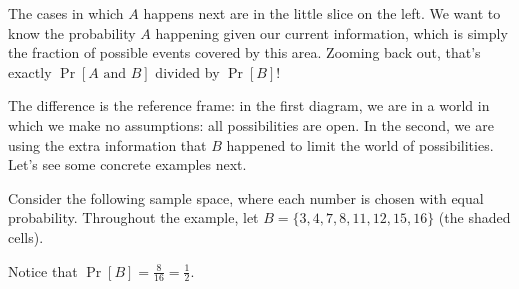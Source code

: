 The cases in which $A$ happens next are in the little slice on the 
left. We want to know the probability $A$ happening given our current 
information, which is simply the fraction of possible events covered by 
this area. Zooming back out, that's exactly $\Pr[A \text{ and } B]$ 
divided by $\Pr[B]$!

The difference is the reference frame: in the first diagram, we are in a 
world in which we make no assumptions: all possibilities are open. In 
the second, we are using the extra information that $B$ happened to 
limit the world of possibilities. Let's see some concrete examples next.

\begin{example}\label{ex:cond-vis}
    Consider the following sample space, where each number is chosen with 
    equal probability.
    Throughout the example, let $B = \{3,4,7,8,11,12,15,16\}$ (the shaded 
    cells).

    \begin{center}
    \end{center}

    Notice that $\Pr[B] = \frac{8}{16} = \frac{1}{2}$.
    


\end{example}

